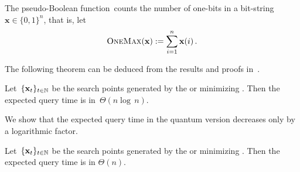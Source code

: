 The pseudo-Boolean function~\onemax counts the number of one-bits in a bit-string~$\mathbf{x}\in\{0,1\}^n$, that is, let
\begin{equation}
\textsc{OneMax}(\mathbf{x}):=\sum_{i=1}^n \mathbf{x}(i)\,.
\end{equation}

The following theorem can be deduced from the results and proofs in~\cite{DJWoneone}.
\begin{theorem}
Let~$\{\mathbf{x}_t\}_{t\in\mathbb{N}}$ be the search points generated by the \ooea or \rls minimizing \onemax. Then the expected query time is in~$\Theta(n\log\,n)$.
\end{theorem}

We show that the expected query time in the quantum version decreases only by a logarithmic factor.
\begin{theorem}
Let~$\{\mathbf{x}_t\}_{t\in\mathbb{N}}$ be the search points generated by the \qooea or \qrls minimizing \onemax. Then the expected query time is in $\Theta(n)$.
\end{theorem}

